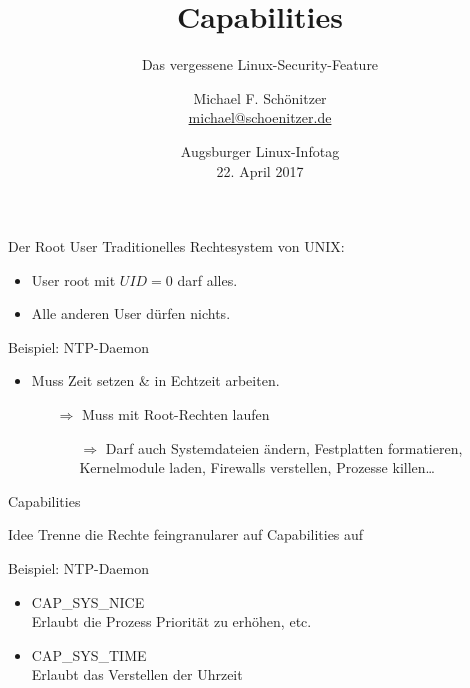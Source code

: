 \documentclass[usenames,dvipsnames,10pt]{beamer}
\author[Michael F. Schönitzer]{Michael F. Schönitzer \\ \href{mailto:michael@schoenitzer.de}{michael@schoenitzer.de}}
\title{Capabilities}
\subtitle{Das vergessene Linux-Security-Feature}
\date[22. April 2017]{Augsburger Linux-Infotag \\ 22. April 2017}
\begin{document}
\begin{frame}[plain]
\titlepage
\end{frame}


\begin{frame}[<+->]{Der Root User}
	Traditionelles Rechtesystem von UNIX:
	\begin{itemize}
	\item User root mit $UID = 0$ darf alles.
	\item Alle anderen User dürfen \glqq nichts\grqq.
	\end{itemize}
	
	\vspace{1cm}
	
	\begin{block}{Beispiel: NTP-Daemon}
	\begin{itemize}
	\item Muss Zeit setzen \& in Echtzeit arbeiten.
		\begin{itemize}
		\item[$\Rightarrow$] Muss mit Root-Rechten laufen
		\begin{itemize}
		\item[$\Rightarrow$] Darf auch Systemdateien ändern, Festplatten formatieren, Kernelmodule laden, Firewalls verstellen, Prozesse killen…
		\end{itemize}
		\end{itemize}
	\end{itemize}
	\end{block}
\end{frame}

\begin{frame}{Capabilities}
	\begin{block}{Idee}
	Trenne die Rechte feingranularer auf Capabilities auf
	\end{block}
	\pause
	\vfill
	\begin{block}{Beispiel: NTP-Daemon}
	\begin{itemize}
		\item CAP\_SYS\_NICE \\
		Erlaubt die Prozess Priorität zu erhöhen, etc.
		\item CAP\_SYS\_TIME \\
		Erlaubt das Verstellen der Uhrzeit		
	\end{itemize}
	\end{block}
\end{frame}
\end{document}
